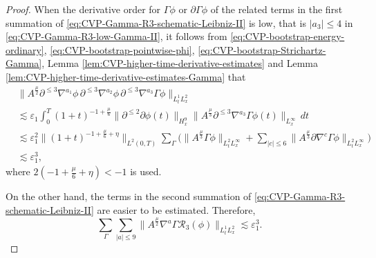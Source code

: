 \documentclass[11pt,twoside]{article}
\def\p{\partial}
\def\ve{\varepsilon}
\def\ls{\lesssim}
\theoremstyle{plain}
\theoremstyle{definition}
\theoremstyle{assumption}
\numberwithin{equation}{section}
\begin{document}
\begin{proof}
		When the derivative order for \(\Gamma\phi\) or \(\p\Gamma\phi\) of the related terms in the first summation
of \eqref{eq:CVP-Gamma-R3-schematic-Leibniz-II} is low, that is $|a_3|\le 4$ in \eqref{eq:CVP-Gamma-R3-low-Gamma-II}, it follows from
		\eqref{eq:CVP-bootstrap-energy-ordinary}, \eqref{eq:CVP-bootstrap-pointwise-phi}, \eqref{eq:CVP-bootstrap-Strichartz-Gamma}, Lemma \ref{lem:CVP-higher-time-derivative-estimates} 	and Lemma \ref{lem:CVP-higher-time-derivative-estimates-Gamma} that
		\begin{equation}
			\label{eq:CVP-Gamma-R3-low-Gamma-II}
			\begin{aligned}
				&\big\|A^{\frac{\mu}{2}}
				\p^{\le3}\nabla^{a_1}\phi\,
				\p^{\le3}\nabla^{a_2}\phi\,
				\p^{\le3}\nabla^{a_3}\Gamma\phi
				\big\|_{L^1_tL^2_x}\\
				&\ls
				\ve_1
				\int_0^T
				(1+t)^{-1+\frac{\mu}{6}}
				\|\p^{\le2}\p\phi(t)\|_{H^{9}_x}
				\big\|
				A^{\frac{\mu}{3}}
				\p^{\le3}\nabla^{a_3}\Gamma\phi(t)
				\big\|_{L^\infty_x}
				\,dt
				\\
				&\ls
				\ve_1^2
				\big\|
				(1+t)^{-1+\frac{\mu}{6}+\eta}
				\big\|_{L^2(0,T)}
				\sum_{\Gamma}
				\big(
				\big\|
				A^{\frac{\mu}{3}}\Gamma\phi
				\big\|_{L^2_tL^\infty_x}
				+\sum_{|c|\le 6}
				\big\|
				A^{\frac{\mu}{3}}
				\p\nabla^c\Gamma\phi
				\big\|_{L^2_tL^\infty_x}
				\big)
				\\
				&\ls
				\ve_1^3,
			\end{aligned}
		\end{equation}
		where $2\left(-1+\frac{\mu}{6}+\eta\right)<-1$ is used.
		
		On the other hand, the terms in the second summation of \eqref{eq:CVP-Gamma-R3-schematic-Leibniz-II}
are easier to be estimated. Therefore,
		\begin{equation}
			\label{eq:CVP-R3-source-final-II}
			\sum_{\Gamma}
			\sum_{|a|\le 9}
			\big\|
			A^{\frac{\mu}{2}}
			\nabla^a\Gamma\mathcal R_3(\phi)
			\big\|_{L^1_tL^2_x}
			\ls
			\ve_1^3.
		\end{equation}
		

\end{proof}
\end{document}
